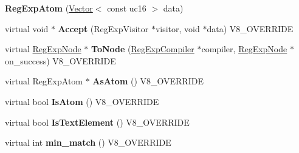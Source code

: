 \begin{DoxyCompactItemize}
\item 
\hypertarget{classv8_1_1internal_1_1_v8___f_i_n_a_l_a8e9df35d68a4b65ed2425fda2a9916fc}{}{\bfseries Reg\+Exp\+Atom} (\hyperlink{classv8_1_1internal_1_1_vector}{Vector}$<$ const uc16 $>$ data)\label{classv8_1_1internal_1_1_v8___f_i_n_a_l_a8e9df35d68a4b65ed2425fda2a9916fc}

\item 
\hypertarget{classv8_1_1internal_1_1_v8___f_i_n_a_l_a5a421cb811caf33f244ce08fe3e5ac14}{}virtual void $\ast$ {\bfseries Accept} (Reg\+Exp\+Visitor $\ast$visitor, void $\ast$data) V8\+\_\+\+O\+V\+E\+R\+R\+I\+D\+E\label{classv8_1_1internal_1_1_v8___f_i_n_a_l_a5a421cb811caf33f244ce08fe3e5ac14}

\item 
\hypertarget{classv8_1_1internal_1_1_v8___f_i_n_a_l_aa183d4adede0c6af0c092eeebf59c194}{}virtual \hyperlink{classv8_1_1internal_1_1_reg_exp_node}{Reg\+Exp\+Node} $\ast$ {\bfseries To\+Node} (\hyperlink{classv8_1_1internal_1_1_reg_exp_compiler}{Reg\+Exp\+Compiler} $\ast$compiler, \hyperlink{classv8_1_1internal_1_1_reg_exp_node}{Reg\+Exp\+Node} $\ast$on\+\_\+success) V8\+\_\+\+O\+V\+E\+R\+R\+I\+D\+E\label{classv8_1_1internal_1_1_v8___f_i_n_a_l_aa183d4adede0c6af0c092eeebf59c194}

\item 
\hypertarget{classv8_1_1internal_1_1_v8___f_i_n_a_l_a9fd44ef8962a0f2a74e3e7609e047a66}{}virtual Reg\+Exp\+Atom $\ast$ {\bfseries As\+Atom} () V8\+\_\+\+O\+V\+E\+R\+R\+I\+D\+E\label{classv8_1_1internal_1_1_v8___f_i_n_a_l_a9fd44ef8962a0f2a74e3e7609e047a66}

\item 
\hypertarget{classv8_1_1internal_1_1_v8___f_i_n_a_l_af700f5e7fb60fa7798fe8a24e0703ce4}{}virtual bool {\bfseries Is\+Atom} () V8\+\_\+\+O\+V\+E\+R\+R\+I\+D\+E\label{classv8_1_1internal_1_1_v8___f_i_n_a_l_af700f5e7fb60fa7798fe8a24e0703ce4}

\item 
\hypertarget{classv8_1_1internal_1_1_v8___f_i_n_a_l_a74df85cf747c0d931e5c99ae7831685f}{}virtual bool {\bfseries Is\+Text\+Element} () V8\+\_\+\+O\+V\+E\+R\+R\+I\+D\+E\label{classv8_1_1internal_1_1_v8___f_i_n_a_l_a74df85cf747c0d931e5c99ae7831685f}

\item 
\hypertarget{classv8_1_1internal_1_1_v8___f_i_n_a_l_ac4abdb29d336dc24ef96695ac805b1ac}{}virtual int {\bfseries min\+\_\+match} () V8\+\_\+\+O\+V\+E\+R\+R\+I\+D\+E\label{classv8_1_1internal_1_1_v8___f_i_n_a_l_ac4abdb29d336dc24ef96695ac805b1ac}


\end{DoxyCompactItemize}
